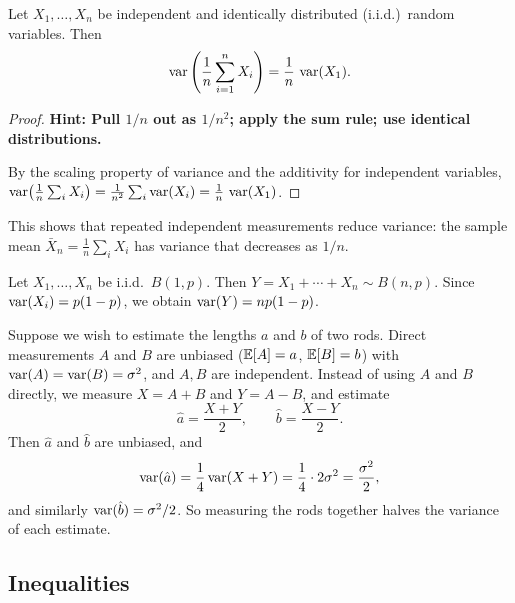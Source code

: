 \documentclass[a4paper]{article}
\begin{document}
\begin{cor}
  Let $X_1, \dotsc, X_n$ be independent and identically distributed (i.i.d.)\ random variables. Then
  \[
    \operatorname{var}\left(\frac{1}{n}\sum_{i=1}^{n} X_i\right) = \frac{1}{n}\,\operatorname{var} (X_1).
  \]
\end{cor}

\begin{proof}
  \textbf{Hint: Pull $1/n$ out as $1/n^2$; apply the sum rule; use identical distributions.}

  By the scaling property of variance and the additivity for independent variables,
  $\operatorname{var}\bigl(\frac{1}{n}\sum_i X_i\bigr) = \frac{1}{n^2}\sum_i \operatorname{var}(X_i) = \frac{1}{n}\,\operatorname{var}(X_1)$.
\end{proof}

\begin{remark}
  This shows that repeated independent measurements reduce variance: the sample mean $\bar{X}_n = \frac{1}{n}\sum_i X_i$ has variance that decreases as $1/n$.
\end{remark}

\begin{eg}
  Let $X_1, \dotsc, X_n$ be i.i.d.\ $B(1, p)$. Then $Y = X_1 + \cdots + X_n \sim B(n, p)$.  Since $\operatorname{var}(X_i) = p(1 - p)$, we obtain $\operatorname{var}(Y) = np(1 - p)$.
\end{eg}

\begin{eg}
  Suppose we wish to estimate the lengths $a$ and $b$ of two rods. Direct measurements $A$ and $B$ are unbiased ($\mathbb{E}[A] = a$, $\mathbb{E}[B] = b$) with $\operatorname{var}(A) = \operatorname{var}(B) = \sigma^2$, and $A, B$ are independent. Instead of using $A$ and $B$ directly, we measure $X = A + B$ and $Y = A - B$, and estimate
  \[
    \hat{a} = \frac{X + Y}{2},\qquad \hat{b} = \frac{X - Y}{2}.
  \]
  Then $\hat{a}$ and $\hat{b}$ are unbiased, and
  \[
    \operatorname{var}(\hat{a}) = \frac{1}{4}\operatorname{var}(X + Y) = \frac{1}{4}\cdot 2\sigma^2 = \frac{\sigma^2}{2},
  \]
  and similarly $\operatorname{var}(\hat{b}) = \sigma^2/2$. So measuring the rods together halves the variance of each estimate.
\end{eg}

\subsection{Inequalities}
\end{document}
